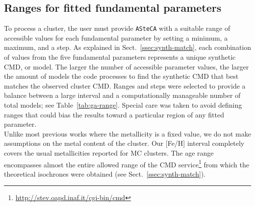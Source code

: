\documentclass[draft]{aa}
\begin{document}

\subsection{Ranges for fitted fundamental parameters}
\label{ssec:param-ranges}

To process a cluster, the user must provide \texttt{ASteCA} with a
suitable range of accessible values for each fundamental parameter by
setting a minimum, a maximum, and a step.
%
As explained in Sect.~\ref{ssec:synth-match}, each combination of values
from the five fundamental parameters represents a unique synthetic CMD, or
model.
%
%
The larger the number of accessible parameter values, the larger the
amount of models the code processes to find the synthetic CMD that best
matches the observed cluster CMD.\@
%
Ranges and steps were selected to provide a balance between a large interval
and a computationally manageable number of total models;
see Table~\ref{tab:ga-range}. Special care was taken to avoid defining ranges
that could bias the results toward a particular region of any fitted
parameter.\\

Unlike most previous works where the metallicity is a fixed value, we do not
make assumptions on the metal content of the cluster. Our [Fe/H] interval
completely covers the usual metallicities reported for MC clusters.
The age range encompasses almost the entire allowed range of the CMD
service\footnote{\url{http://stev.oapd.inaf.it/cgi-bin/cmd}}
from which the theoretical isochrones were obtained (see
Sect.~\ref{ssec:synth-match}).
\end{document}
